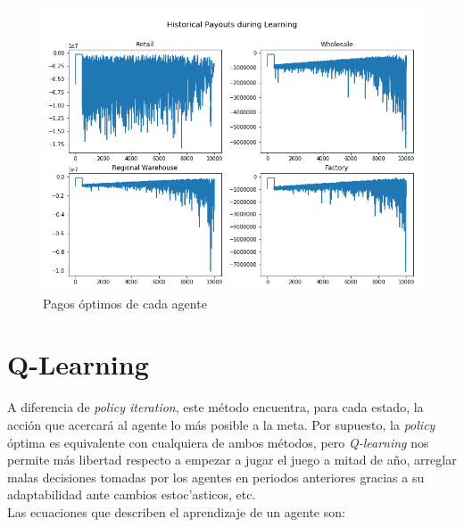 \begin{figure}[ht]
\caption{Pagos \'optimos de cada agente}
\label{politer_payouts}
\includegraphics[width=15cm]{tesis_tex/figs/policyiteration_payouts.png}
\centering
\end{figure}

\section{Q-Learning}

A diferencia de \textit{policy iteration}, este m\'etodo encuentra, para cada estado, la acci\'on que acercar\'a al agente lo m\'as posible a la meta. Por supuesto, la \textit{policy} \'optima es equivalente con cualquiera de ambos m\'etodos, pero \textit{Q-learning} nos permite m\'as libertad respecto a empezar a jugar el juego a mitad de a\~no, arreglar malas decisiones tomadas por los agentes en periodos anteriores gracias a su adaptabilidad ante cambios estoc'asticos, etc.\\

Las ecuaciones que describen el aprendizaje de un agente son:

